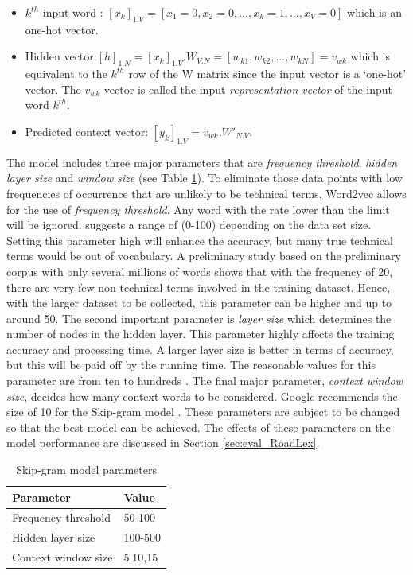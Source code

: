 \documentclass[Journal,InsideFigs, DoubleSpace]{ascelike} %
\begin{document}
%
\begin{itemize}
	\item $k^{th}$ input word : $[x_k]_{1.V} = [x_1=0, x_2=0,...,x_k=1,..., x_V=0]$ which is an one-hot vector.
	\item Hidden vector:$[h]_{1.N} = [x_k]_{1.V}.W_{V.N} = [w_{k1},w_{k2},..., w_{kN}]= v_{wk}$ which is equivalent to the $k^{th}$ row of the W matrix since the input vector is a `one-hot' vector. The $v_{wk}$ vector is called the input \textit{representation vector} of the input word $k^{th}$.
	\item Predicted context vector: $[y_k]_{1.V} = v_{wk}.W'_{N.V}$. 
\end{itemize}
%
\par
The model includes three major parameters that are \textit{frequency threshold}, \textit{hidden layer size} and \textit{window size} (see Table \ref{table:nn-parameters}). To eliminate those data points with low frequencies of occurrence that are unlikely to be technical terms, Word2vec allows for the use of \textit{frequency threshold}. Any word with the rate lower than the limit will be ignored.  suggests a range of (0-100) depending on the data set size. Setting this parameter high will enhance the accuracy, but many true technical terms would be out of vocabulary. A preliminary study based on the preliminary corpus with only several millions of words shows that with the frequency of 20, there are very few non-technical terms involved in the training dataset. Hence, with the larger dataset to be collected, this parameter can be higher and up to around 50. The second important parameter is \textit{layer size} which determines the number of nodes in the hidden layer. This parameter highly affects the training accuracy and processing time. A larger layer size is better in terms of accuracy, but this will be paid off by the running time. The reasonable values for this parameter are from ten to hundreds \cite{rehurek14}. The final major parameter, \textit{context window size}, decides how many context words to be considered. Google recommends the size of 10 for the Skip-gram model \cite{google2016}. These parameters are subject to be changed so that the best model can be achieved. The effects of these parameters on the model performance are discussed in Section \ref{sec:eval_RoadLex}.
%
\begin{table} [t]
	\caption{Skip-gram model parameters}
	\label{table:nn-parameters}
	\centering
	\small
	\renewcommand{\arraystretch}{1.25}
	\begin{tabular}{l l}
		\hline
		\textbf{Parameter} & \textbf{Value}\\
		\hline
		Frequency threshold & 50-100\\
		Hidden layer size		&	100-500\\
		Context window size	&	5,10,15\\
		\hline
	\end{tabular}
	\normalsize
\end{table}
\end{document}
